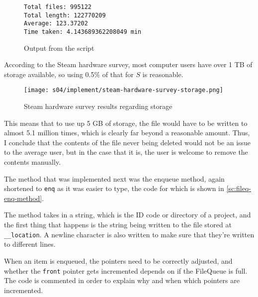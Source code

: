        \begin{figure}[!ht]
            \begin{verbatim}
Total files: 995122
Total length: 122770209
Average: 123.37202
Time taken: 4.143689362208049 min
            \end{verbatim}
            \caption{Output from the script}
            \label{fig:avg-filepath-output}
        \end{figure}

        According to the Steam hardware survey, most computer users have over 1 \si{TB} of storage available, so using 0.5\% of that for $S$ is reasonable. 

        \begin{figure}[!ht]
            \centering
            \texttt{[image: s04/implement/steam-hardware-survey-storage.png]}
            \caption{Steam hardware survey results regarding storage}
            \label{fig:steam-hw-survey-storage}
        \end{figure}

        This means that to use up 5 \si{GB} of storage, the file would have to be written to almost 5.1 million times, which is clearly far beyond a reasonable amount. Thus, I conclude that the contents of the file never being deleted would not be an issue to the average user, but in the case that it is, the user is welcome to remove the contents manually. 



        The method that was implemented next was the enqueue method, again shortened to \verb|enq| as it was easier to type, the code for which is shown in \autoref{sc:fileq-enq-method}. 

        The method takes in a string, which is the ID code or directory of a project, and the first thing that happens is the string being written to the file stored at \verb|__location|. A newline character is also written to make sure that they're written to different lines. 

        When an item is enqueued, the pointers need to be correctly adjusted, and whether the \verb|front| pointer gets incremented depends on if the FileQueue is full. The code is commented in order to explain why and when which pointers are incremented. 


